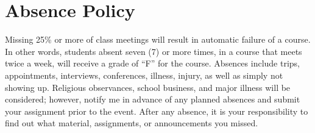 \documentclass{article}
\begin{document}
\section*{Absence Policy}
Missing 25\% or more of class meetings will result in automatic failure of a course. In other words, students absent seven (7) or more times, in a course that meets twice a week, will receive a grade of ``F'' for the course.  Absences include trips, appointments, interviews, conferences, illness, injury, as well as simply not showing up. Religious observances, school business, and major illness will be considered; however, notify me in advance of any planned absences and submit your assignment prior to the event. After any absence, it is your responsibility to find out what material, assignments, or announcements you missed.


\pagebreak


\end{document}
